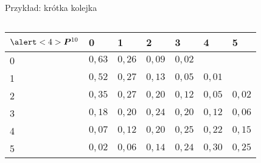 \documentclass{mp}
\begin{document}
\begin{frame}{Przykład: krótka kolejka}
{\begin{columns}[T]
\begin{column}{.49\textwidth}
{{}
{
\begin{tabular}{l|llllll}
$\alert<4>{\bm{P}^{10}}$ & 0 & 1 & 2 & 3 & 4 & 5\\
\hline
 0 &  $0{,}63$ & $0{,}26$ & $0{,}09$ & $0{,}02$ &  &  \\
 1 &  $0{,}52$ & $0{,}27$ & $0{,}13$ & $0{,}05$ & $0{,}01$ &  \\
 2 &  $0{,}35$ & $0{,}27$ & $0{,}20$ & $0{,}12$ & $0{,}05$ & $0{,}02$ \\
 3 &  $0{,}18$ & $0{,}20$ & $0{,}24$ & $0{,}20$ & $0{,}12$ & $0{,}06$ \\
 4 &  $0{,}07$ & $0{,}12$ & $0{,}20$ & $0{,}25$ & $0{,}22$ & $0{,}15$ \\
 5 &  $0{,}02$ & $0{,}06$ & $0{,}14$ & $0{,}24$ & $0{,}30$ & $0{,}25$ \\
\end{tabular}
}
}
\end{column}
\end{columns}
}
\end{frame}
\end{document}
